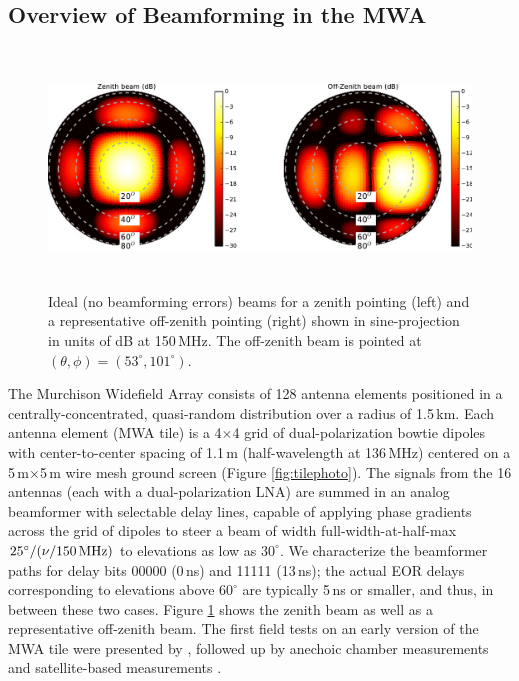 \subsection{Overview of Beamforming in the MWA}

 \begin{figure}[t]
 \centering
\includegraphics[height=2.5in]{chap2_beamforming_errors/zenith_and_offzenith_beams-eps-converted-to.pdf}
\caption[Ideal (no beamforming errors) beams for zenith (left) and off-zenith (right) pointings.]{Ideal (no beamforming errors) beams for a zenith pointing (left) and a representative off-zenith pointing (right) shown in sine-projection in units of dB at 150\,MHz. The off-zenith beam is pointed at $(\theta,\phi) = (53^\circ,101^\circ)$. }
\label{fig:idealbeams}
\end{figure}

The Murchison Widefield Array consists of 128 antenna elements positioned in a centrally-concentrated, quasi-random distribution over a radius of 1.5\,km. Each antenna element (MWA tile) is a 4$\times$4 grid of dual-polarization bowtie dipoles with center-to-center spacing of 1.1\,m (half-wavelength at 136\,MHz) centered on a 5\,m$ \times $5\,m wire mesh ground screen (Figure \ref{fig:tilephoto}). The signals from the 16 antennas (each with a dual-polarization LNA) are summed in an analog beamformer with selectable delay lines, capable of applying phase gradients across the grid of dipoles to steer a beam of width full-width-at-half-max $25^\circ/(\nu/150\text{\,MHz})$ to elevations as low as $30^\circ$. We characterize the beamformer paths for delay bits 00000 (0\,ns) and 11111 (13\,ns); the actual EOR delays corresponding to elevations above $60^\circ$ are typically 5\,ns or smaller, and thus, in between these two cases. Figure \ref{fig:idealbeams} shows the zenith beam as well as a representative off-zenith beam. The first field tests on an early version of the MWA tile were presented by \citet{bowman07}, followed up by anechoic chamber measurements \citep{williamsthesis2012} and satellite-based measurements  \citep{neben15}.

